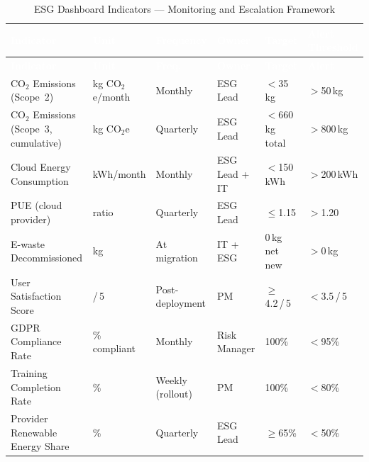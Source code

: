 \vspace{0.5em}
\begin{longtable}{p{3.0cm} p{1.6cm} p{1.8cm} p{1.9cm} p{2.0cm} p{2.3cm}}
\caption{ESG Dashboard Indicators --- Monitoring and Escalation Framework}
\label{tab:esg-dashboard} \\

\rowcolor{headerrow}
\textcolor{white}{\textbf{Indicator}} &
\textcolor{white}{\textbf{Unit}} &
\textcolor{white}{\textbf{Frequency}} &
\textcolor{white}{\textbf{Owner}} &
\textcolor{white}{\textbf{Target}} &
\textcolor{white}{\textbf{Alert Threshold}} \\
\midrule
\endfirsthead

\rowcolor{headerrow}
\textcolor{white}{\textbf{Indicator}} &
\textcolor{white}{\textbf{Unit}} &
\textcolor{white}{\textbf{Freq.}} &
\textcolor{white}{\textbf{Owner}} &
\textcolor{white}{\textbf{Target}} &
\textcolor{white}{\textbf{Alert}} \\
\midrule
\endhead

\rowcolor{rowalt}
  CO$_2$ Emissions (Scope~2) &
  kg CO$_2$e/month & Monthly & ESG Lead &
  $<$35\,kg & $>$50\,kg \\

  CO$_2$ Emissions (Scope~3, cumulative) &
  kg CO$_2$e & Quarterly & ESG Lead &
  $<$660\,kg total & $>$800\,kg \\

\rowcolor{rowalt}
  Cloud Energy Consumption &
  kWh/month & Monthly & ESG Lead + IT &
  $<$150\,kWh & $>$200\,kWh \\

  PUE (cloud provider) &
  ratio & Quarterly & ESG Lead &
  $\leq$1.15 & $>$1.20 \\

\rowcolor{rowalt}
  E-waste Decommissioned &
  kg & At migration & IT + ESG &
  0\,kg net new & $>$0\,kg \\

  User Satisfaction Score &
  /\,5 & Post-deployment & PM &
  $\geq$4.2\,/\,5 & $<$3.5\,/\,5 \\

\rowcolor{rowalt}
  GDPR Compliance Rate &
  \% compliant & Monthly & Risk Manager &
  100\% & $<$95\% \\

  Training Completion Rate &
  \% & Weekly (rollout) & PM &
  100\% & $<$80\% \\

\rowcolor{rowalt}
  Provider Renewable Energy Share &
  \% & Quarterly & ESG Lead &
  $\geq$65\% & $<$50\% \\

\bottomrule
\end{longtable}

